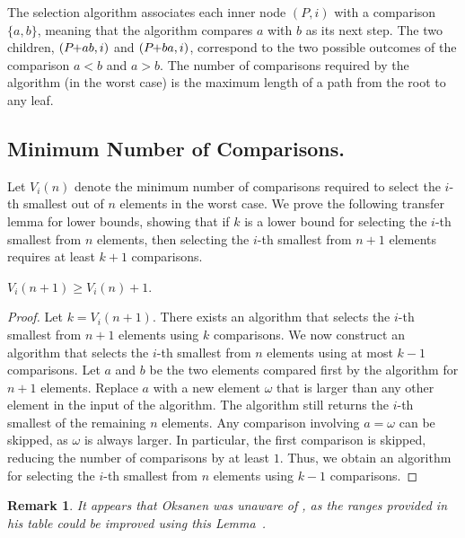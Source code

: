 \documentclass[twoside,leqno,twocolumn]{article}
\newcommand{\pchild}[3]{{#1}\kern-1pt{+}{#2}{#3}}
\newtheorem{remark}{Remark}[section]
\begin{document}
The selection algorithm associates each inner node $(P, i)$ with a comparison $\{a, b\}$, meaning that the algorithm compares $a$ with $b$ as its next step.
The two children, $(\pchild{P}{a}{b}, i)$ and $(\pchild{P}{b}{a}, i)$, correspond to the two possible outcomes of the comparison $a < b$ and $a > b$.
The number of comparisons required by the algorithm (in the worst case) is the maximum length of a path from the root to any leaf.


\subsection{Minimum Number of Comparisons.}

Let $V_i(n)$ denote the minimum number of comparisons required to select the $i$-th smallest out of $n$ elements in the worst case.
We prove the following transfer lemma for lower bounds, showing that if $k$ is a lower bound for selecting the $i$-th smallest from $n$ elements, then selecting the $i$-th smallest from $n + 1$ elements requires at least $k + 1$ comparisons.

\begin{lemma} \label{lemma:previous_next_poset}
  $V_i(n + 1) \geq V_i(n) + 1$.
\end{lemma}

\begin{proof}
  Let $k = V_i(n + 1)$.
  There exists an algorithm that selects the $i$-th smallest from $n + 1$ elements using $k$ comparisons.
  We now construct an algorithm that selects the $i$-th smallest from $n$ elements using at most $k - 1$ comparisons.
  Let $a$ and $b$ be the two elements compared first by the algorithm for $n + 1$ elements.
  Replace $a$ with a new element $\omega$ that is larger than any other element in the input of the algorithm.
  The algorithm still returns the $i$-th smallest of the remaining $n$ elements.
  Any comparison involving $a = \omega$ can be skipped, as $\omega$ is always larger.
  In particular, the first comparison is skipped, reducing the number of comparisons by at least $1$.
  Thus, we obtain an algorithm for selecting the $i$-th smallest from $n$ elements using $k - 1$ comparisons.
\end{proof}

\begin{remark}
  It appears that Oksanen was unaware of , as the ranges provided in his table could be improved using this Lemma~\cite{Oksanen}.
\end{remark}
\end{document}

